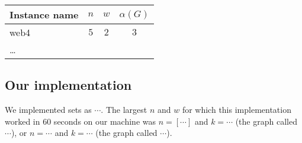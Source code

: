\documentclass{tufte-handout}
\begin{document}
\medskip
\begin{tabular}{lccc}
  \toprule
  Instance name & $n$ & $w$ & $\alpha(G)$   \\
  \midrule
  web4 & $5$ & $2$ & $3$ \\ 
  \ldots\\
  \bottomrule
\end{tabular}


\subsection{Our implementation}

We implemented sets as $\cdots$.
The largest $n$ and $w$ for which this implementation worked  in 60 seconds on our
machine was $n=[\cdots]$ and $k=\cdots$ (the graph called $\cdots$), or $n=\cdots$ and $k=\cdots$ (the graph called $\cdots$).
\end{document}
